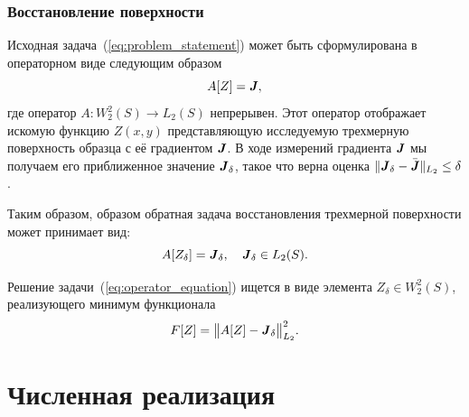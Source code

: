 \documentclass{beamer}
\begin{document}
\begin{frame}[c,allowframebreaks]
    \frametitle{Восстановление поверхности}

    Исходная задача~(\ref{eq:problem_statement}) может быть сформулирована в операторном виде следующим образом
    \begin{equation*}
        \label{operator_equation_0}
        A[Z] = {\textbf{\emph{J}}},
    \end{equation*}
где оператор $A: W_2^2(S) \to L_2(S)$ непрерывен. Этот оператор отображает искомую функцию $Z(x,y)$
представляющую исследуемую трехмерную поверхность образца с её градиентом ${\textbf{\emph{J}}}$.
В ходе измерений градиента ${\textbf{\emph{J}}}$ мы получаем его приближенное значение
$\textbf{\emph{J}}_\delta$, такое что верна оценка
$\|{\textbf{\emph{J}}}_\delta-\bar{{\textbf{\emph{J}}}}\|_{L_2}\leq\delta$.

    \framebreak

    Таким образом, образом обратная задача восстановления трехмерной поверхности может принимает
    вид:
    \begin{equation}
        \label{eq:operator_equation}
        A[Z_\delta] = {\textbf{\emph{J}}}_\delta, \quad {\textbf{\emph{J}}}_\delta \in L_2(S).
    \end{equation}

    Решение задачи~(\ref{eq:operator_equation}) ищется в виде элемента $Z_\delta \in W_2^2(S)$,
    реализующего минимум функционала
    \begin{equation}
        \label{functional}
        F[Z] = \big\|A[Z] - {\textbf{\emph{J}}}_\delta\big\|_{L_2}^2.
    \end{equation}
\end{frame}




\section{Численная реализация}
\begin{frame}
    \sectionpage
\end{frame}
\end{document}
